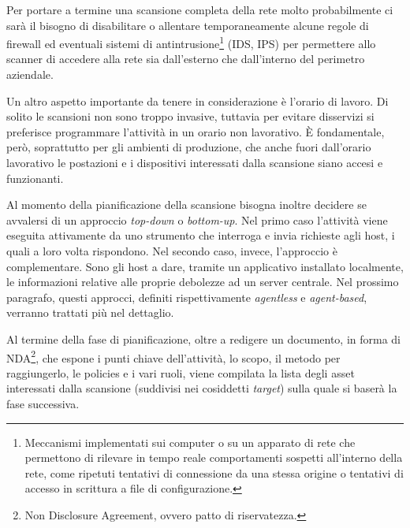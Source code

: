 \documentclass[target=mst,aauheader=]{thud}
\begin{document}
Per portare a termine una scansione completa della rete molto probabilmente ci sarà il bisogno di disabilitare o allentare temporaneamente alcune regole di firewall ed eventuali sistemi di antintrusione\footnote{Meccanismi implementati sui computer o su un apparato di rete che permettono di rilevare in tempo reale comportamenti sospetti all’interno della rete, come ripetuti tentativi di connessione da una stessa origine o tentativi di accesso in scrittura a file di configurazione.} (IDS, IPS) per permettere allo scanner di accedere alla rete sia dall’esterno che dall’interno del perimetro aziendale. 

Un altro aspetto importante da tenere in considerazione è l’orario di lavoro. Di solito le scansioni non sono troppo invasive, tuttavia per evitare disservizi si preferisce programmare l’attività in un orario non lavorativo. È fondamentale, però, soprattutto per gli ambienti di produzione, che anche fuori dall’orario lavorativo le postazioni e i dispositivi interessati dalla scansione siano accesi e funzionanti.

Al momento della pianificazione della scansione bisogna inoltre decidere se avvalersi di un approccio \textit{top-down} o \textit{bottom-up}. Nel primo caso l’attività viene eseguita attivamente da uno strumento che interroga e invia richieste agli host, i quali a loro volta rispondono. Nel secondo caso, invece, l’approccio è complementare. Sono gli host a dare, tramite un applicativo installato localmente, le informazioni relative alle proprie debolezze ad un server centrale. Nel prossimo paragrafo, questi approcci, definiti rispettivamente \textit{agentless} e \textit{agent-based}, verranno trattati più nel dettaglio.

Al termine della fase di pianificazione, oltre a redigere un documento, in forma di NDA\footnote{Non Disclosure Agreement, ovvero patto di riservatezza.}, che espone i punti chiave dell’attività, lo scopo, il metodo per raggiungerlo, le policies e i vari ruoli, viene compilata la lista degli asset interessati dalla scansione (suddivisi nei cosiddetti \textit{target}) sulla quale si baserà la fase successiva.
\end{document}
